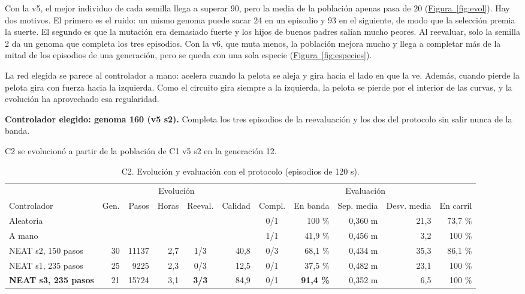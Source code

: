 \documentclass[11pt,a4paper]{article}
\makeatletter
\newcommand{\grados}{\textdegree}
\newcommand{\figref}[1]{\hyperref[#1]{Figura~\ref*{#1}}}
\renewcommand\subsection{\@startsection{subsection}{2}{\z@}{-1.5ex plus -0.3ex}{0.6ex}{\normalfont\normalsize\bfseries}}
\makeatother
\begin{document}
Con la v5, el mejor individuo de cada semilla llega a superar 90, pero la media de la población apenas pasa de 20
(\figref{fig:evol}). Hay dos motivos. El primero es el ruido: un mismo genoma puede sacar 24 en un episodio y 93
en el siguiente, de modo que la selección premia la suerte. El segundo es que la mutación era demasiado fuerte y
los hijos de buenos padres salían mucho peores. Al reevaluar, solo la semilla 2 da un genoma que completa los tres
episodios. Con la v6, que muta menos, la población mejora mucho y llega a completar más de la mitad de los
episodios de una generación, pero se queda con una sola especie (\figref{fig:especies}).

La red elegida se parece al controlador a mano: acelera cuando la pelota se aleja y gira hacia el lado en que la
ve. Además, cuando pierde la pelota gira con fuerza hacia la izquierda. Como el circuito gira siempre a la
izquierda, la pelota se pierde por el interior de las curvas, y la evolución ha aprovechado esa regularidad.

\textbf{Controlador elegido: genoma 160 (v5 s2).} Completa los tres episodios de la reevaluación y los dos del
protocolo sin salir nunca de la banda.

\subsection{C2: crucero 10-40}

C2 se evolucionó a partir de la población de C1 v5 s2 en la generación 12.

\begin{table}[h]
\centering\small
\caption{C2. Evolución y evaluación con el protocolo (episodios de 120 s).}
\label{tab:c2}
\begin{adjustbox}{max width=\textwidth}
\begin{tabular}{@{}lrrrcrcrrrr@{}}
\toprule
& \multicolumn{5}{c}{Evolución} & \multicolumn{5}{c}{Evaluación} \\
\cmidrule(lr){2-6}\cmidrule(l){7-11}
Controlador & Gen. & Pasos & Horas & Reeval. & Calidad & Compl. & En banda & Sep. media & Desv. media & En carril \\
\midrule
Aleatoria & & & & & & 0/1 & 100 \% & 0,360 m & 21,3\grados & 73,7 \% \\
A mano & & & & & & 1/1 & 41,9 \% & 0,456 m & 3,2\grados & 100 \% \\
NEAT s2, 150 pasos & 30 & 11137 & 2,7 & 1/3 & 40,8 & 0/3 & 68,1 \% & 0,434 m & 35,3\grados & 86,1 \% \\
NEAT s1, 235 pasos & 25 & 9225 & 2,3 & 0/3 & 12,5 & 0/1 & 37,5 \% & 0,482 m & 23,1\grados & 100 \% \\
\textbf{NEAT s3, 235 pasos} & 21 & 15724 & 3,1 & \textbf{3/3} & 84,9 & 0/1 & \textbf{91,4 \%} & 0,352 m & 6,5\grados & 100 \% \\
\bottomrule
\end{tabular}
\end{adjustbox}
\end{table}
\end{document}
